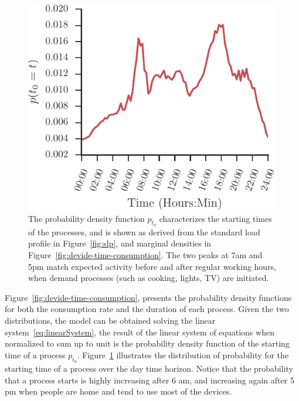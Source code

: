 \documentclass[conference]{IEEEtran}
\begin{document}
\begin{figure}[t]
\centering
\includegraphics[scale=0.8]{figures/t_0.pdf}
\caption{The probability density function $p_{t_0}$ characterizes the starting times of the processes, and is shown as derived from the standard load profile in Figure~\ref{fig:slp}, and marginal densities in Figure~\ref{fig:devide-time-consumption}. The two peaks at 7am and 5pm match expected activity before and after regular working hours, when demand processes (such as cooking, lights, TV) are initiated.}
\label{fig:distribution_t_0}
\end{figure}

Figure~\ref{fig:devide-time-consumption}, presents the probability density functions for both the consumption rate and the duration of each process. Given the two distributions, the model can be obtained solving the linear system~\eqref{eq:linearSystem}, the result of the linear system of equations when normalized to sum up to unit is the probability density function of the starting time of a process $p_{t_0}$. Figure~\ref{fig:distribution_t_0} illustrates the distribution of probability for the starting time of a process over the day time horizon. Notice that the probability that a process starts is highly increasing after 6 am, and increasing again after 5 pm when people are home and tend to use most of the devices.
\end{document}
